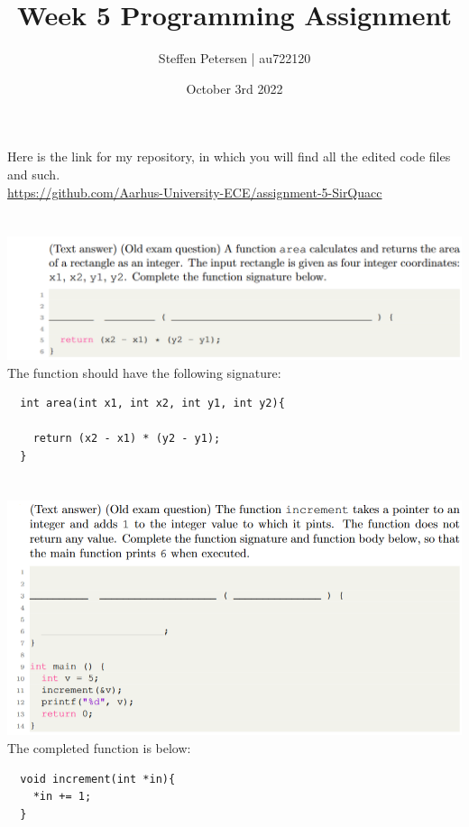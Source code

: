 \documentclass{article}
\title{Week 5 Programming Assignment}
\author{Steffen Petersen | au722120}
\date{October 3rd 2022}
\begin{document}


\maketitle
\vspace{5pt}
\noindent Here is the link for my repository, in which you will find all the edited code files and such.\\
\url{https://github.com/Aarhus-University-ECE/assignment-5-SirQuacc}
\section{}
\includegraphics[width=\linewidth, keepaspectratio=true]{task1}
\vspace{2pt}\\
The function should have the following signature:
\begin{lstlisting}
  int area(int x1, int x2, int y1, int y2){
    
    return (x2 - x1) * (y2 - y1);
  }

\end{lstlisting}

\pagebreak
\section{}
\includegraphics[width=\linewidth, keepaspectratio=true]{task2}
\vspace{2pt}\\
The completed function is below:
\begin{lstlisting}
  void increment(int *in){
    *in += 1;
  }

\end{lstlisting}
\end{document}
